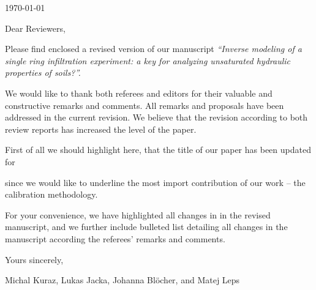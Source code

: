 \documentclass[final,3p, 11pt, a4paper]{elsarticle}
\newcommand{\mich}[1]{{\color{magenta}{#1}}}
\begin{document}
\hfill \noindent\today

\vspace{0.5cm}


\vspace{0.4cm}

\noindent Dear Reviewers,

\vspace{0.5cm}

\noindent Please find enclosed a revised version of our manuscript
{\it ``Inverse modeling of a single ring infiltration experiment: a key for analyzing unsaturated hydraulic properties of soils?''.}

\medskip
\noindent We would like to thank both referees and editors
for their valuable and constructive remarks and
comments. 
All remarks and proposals have been addressed in the current revision.
We believe that the revision according to both review reports has increased the level
of the paper.

First of all we should highlight here, that the title of our paper has been updated for

\medskip


\medskip

\noindent since we would like to underline the most import contribution of our work -- the calibration methodology.

\noindent

 For your convenience, we have highlighted all changes in \mich{magenta} in the revised manuscript,
and we further include bulleted list detailing all changes in the manuscript
according the referees' remarks and comments.

\bigskip

\noindent Yours sincerely,

\medskip


\begin{flushright}
\noindent Michal Kuraz, Lukas Jacka, Johanna Bl\"{o}cher, and Matej Leps
\end{flushright}

\newpage
\end{document}
